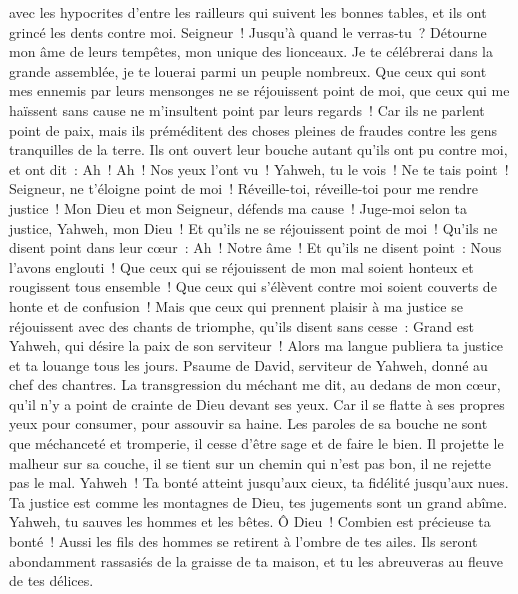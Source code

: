 \begin{multicols}{2}
avec les hypocrites d'entre les railleurs qui suivent les bonnes tables, et ils ont grincé les dents contre moi.
Seigneur~! Jusqu'à quand le verras-tu~? Détourne mon âme de leurs tempêtes, mon unique des lionceaux.
Je te célébrerai dans la grande assemblée, je te louerai parmi un peuple nombreux.
Que ceux qui sont mes ennemis par leurs mensonges ne se réjouissent point de moi, que ceux qui me haïssent sans cause ne m'insultent point par leurs regards~!
Car ils ne parlent point de paix, mais ils préméditent des choses pleines de fraudes contre les gens tranquilles de la terre.
Ils ont ouvert leur bouche autant qu'ils ont pu contre moi, et ont dit~: Ah~! Ah~! Nos yeux l'ont vu~!
Yahweh, tu le vois~! Ne te tais point~! Seigneur, ne t'éloigne point de moi~!
Réveille-toi, réveille-toi pour me rendre justice~! Mon Dieu et mon Seigneur, défends ma cause~!
Juge-moi selon ta justice, Yahweh, mon Dieu~! Et qu'ils ne se réjouissent point de moi~!
Qu'ils ne disent point dans leur cœur~: Ah~! Notre âme~! Et qu'ils ne disent point~: Nous l'avons englouti~!
Que ceux qui se réjouissent de mon mal soient honteux et rougissent tous ensemble~! Que ceux qui s'élèvent contre moi soient couverts de honte et de confusion~!
Mais que ceux qui prennent plaisir à ma justice se réjouissent avec des chants de triomphe, qu'ils disent sans cesse~: Grand est Yahweh, qui désire la paix de son serviteur~!
Alors ma langue publiera ta justice et ta louange tous les jours.
\VerseOne{}Psaume de David, serviteur de Yahweh, donné au chef des chantres.
La transgression du méchant me dit, au dedans de mon cœur, qu'il n'y a point de crainte de Dieu devant ses yeux.
Car il se flatte à ses propres yeux pour consumer, pour assouvir sa haine.
Les paroles de sa bouche ne sont que méchanceté et tromperie, il cesse d'être sage et de faire le bien.
Il projette le malheur sur sa couche, il se tient sur un chemin qui n'est pas bon, il ne rejette pas le mal.
Yahweh~! Ta bonté atteint jusqu'aux cieux, ta fidélité jusqu'aux nues.
Ta justice est comme les montagnes de Dieu, tes jugements sont un grand abîme. Yahweh, tu sauves les hommes et les bêtes.
Ô Dieu~! Combien est précieuse ta bonté~! Aussi les fils des hommes se retirent à l'ombre de tes ailes.
Ils seront abondamment rassasiés de la graisse de ta maison, et tu les abreuveras au fleuve de tes délices.

\end{multicols}
